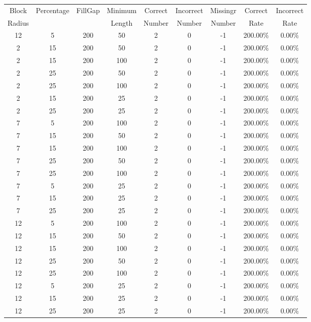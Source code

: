 \clearpage
\begingroup
\setlength{\LTleft}{-20cm plus -1fill}
\setlength{\LTright}{\LTleft}
{\small
\begin{longtable}{| c | c | c | c | c | c | c | c | c |} \hline
Block & Percentage & FillGap & Minimum & Correct & Incorrect & Missingr & Correct & Incorrect \\
Radius &  & & Length & Number & Number & Number & Rate & Rate \\ \hline
12 & 5 & 200 & 50 & 2 & 0 & -1 & 200.00\% & 0.00\% \\
2 & 15 & 200 & 50 & 2 & 0 & -1 & 200.00\% & 0.00\% \\
2 & 15 & 200 & 100 & 2 & 0 & -1 & 200.00\% & 0.00\% \\
2 & 25 & 200 & 50 & 2 & 0 & -1 & 200.00\% & 0.00\% \\
2 & 25 & 200 & 100 & 2 & 0 & -1 & 200.00\% & 0.00\% \\
2 & 15 & 200 & 25 & 2 & 0 & -1 & 200.00\% & 0.00\% \\
2 & 25 & 200 & 25 & 2 & 0 & -1 & 200.00\% & 0.00\% \\
7 & 5 & 200 & 100 & 2 & 0 & -1 & 200.00\% & 0.00\% \\
7 & 15 & 200 & 50 & 2 & 0 & -1 & 200.00\% & 0.00\% \\
7 & 15 & 200 & 100 & 2 & 0 & -1 & 200.00\% & 0.00\% \\
7 & 25 & 200 & 50 & 2 & 0 & -1 & 200.00\% & 0.00\% \\
7 & 25 & 200 & 100 & 2 & 0 & -1 & 200.00\% & 0.00\% \\
7 & 5 & 200 & 25 & 2 & 0 & -1 & 200.00\% & 0.00\% \\
7 & 15 & 200 & 25 & 2 & 0 & -1 & 200.00\% & 0.00\% \\
7 & 25 & 200 & 25 & 2 & 0 & -1 & 200.00\% & 0.00\% \\
12 & 5 & 200 & 100 & 2 & 0 & -1 & 200.00\% & 0.00\% \\
12 & 15 & 200 & 50 & 2 & 0 & -1 & 200.00\% & 0.00\% \\
12 & 15 & 200 & 100 & 2 & 0 & -1 & 200.00\% & 0.00\% \\
12 & 25 & 200 & 50 & 2 & 0 & -1 & 200.00\% & 0.00\% \\
12 & 25 & 200 & 100 & 2 & 0 & -1 & 200.00\% & 0.00\% \\
12 & 5 & 200 & 25 & 2 & 0 & -1 & 200.00\% & 0.00\% \\
12 & 15 & 200 & 25 & 2 & 0 & -1 & 200.00\% & 0.00\% \\
12 & 25 & 200 & 25 & 2 & 0 & -1 & 200.00\% & 0.00\% \\

\end{longtable}}
